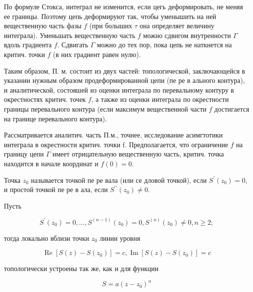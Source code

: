 \documentclass[10pt]{article}
\begin{document}
По формуле Стокса, интеграл не изменится, если цегь деформировать, не меняя ее границы. Поэтому цепь деформируют так, чтобы уменышить на ней вещественную часть фазы $f$ (при болыших $\tau$ она определяет величину интеграла). Уменьшать вещественную часть $f$ можно сдвигом внутренности $\Gamma$ вдоль градиента $f$. Сдвигать $\Gamma$ можно до тех пор, пока цепь не наткнется на критич. точки $f$ (в них градиент равен нулю).



Таким образом, П. м. состоит из двух частей: топологической, заключающейся в указании нужным образом продеформированной цепи (пе ре в ального контура), и аналитической, состояшей из оценки интеграла по перевальному контуру в окрестностях критич. точек $f$, а также из оценки интеграла по окрестности границы перевального контура (если максимум вещественной части $f$ достигается на границе перевального контура).



Рассматривается аналитич. часть П.м., точнее, исследование асимгтотики интеграла в окрестности критич. точки f. Предполагается, что ограничение $f$ на границу цепи $\Gamma$ имеет отрицательную вещественную часть, критич. точка находится в начале координат и $f(0)=0$.



Точка $z_{0}$ называется точкой пе ре вала (или се дловой точкой), если $S^{\prime}\left(z_{0}\right)=0$, и простой точкой пе ре в ала, если $S^{\prime \prime}\left(z_{0}\right) \neq 0$.



Пусть



\[

S^{\prime}\left(z_{0}\right)=0, \ldots, S^{(n-1)}\left(z_{0}\right)=0, S^{(n)}\left(z_{0}\right) \neq 0, n \geqslant 2 ;

\]



тогда локально вблизи точки $z_{0}$ линии уровня



\[

\operatorname{Re}\left[S(z)-S\left(z_{0}\right)\right]=c, \operatorname{Im}\left[S(z)-S\left(z_{0}\right)\right]=c

\]



топологически устроены так же, как и для функции



\[

S=a\left(z-z_{0}\right)^{n}

\]
\end{document}
